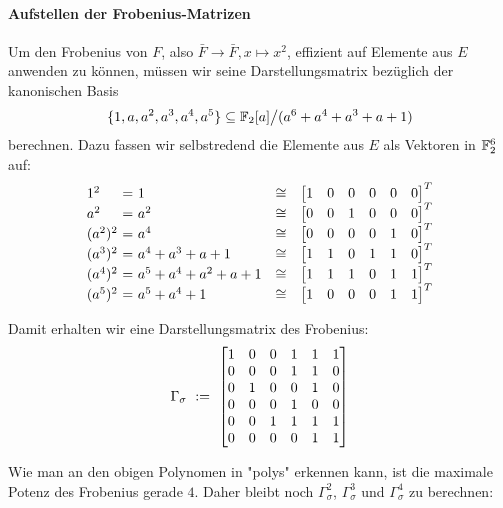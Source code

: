 \paragraph{Aufstellen der Frobenius-Matrizen}
Um den Frobenius von $F$, also 
$\bar F\to \bar F, x\mapsto x^2$,
effizient auf Elemente aus $E$ anwenden zu können,
müssen wir seine Darstellungsmatrix bezüglich der kanonischen Basis
\[\{ 1, a, a^2, a^3, a^4, a^5\} 
  \subseteq \mathbb{F}_2[a]\big/(a^6 + a^4 + a^3 + a + 1)\]
berechnen. Dazu fassen wir selbstredend die Elemente aus $E$ als Vektoren in
$\mathbb{F}_2^6$ auf:
\[\begin{array}{l@{\ =\ }l@{\quad\cong\quad}l}
  1^2 & 1 & \begin{bmatrix}1&0&0&0&0&0\end{bmatrix}^T\\
  a^2 & a^2 & \begin{bmatrix}0&0&1&0&0&0\end{bmatrix}^T\\
  (a^2)^2 & a^4 & \begin{bmatrix}0&0&0&0&1&0\end{bmatrix}^T\\
  (a^3)^2 & a^4+a^3+a+1 & \begin{bmatrix}1&1&0&1&1&0\end{bmatrix}^T\\
  (a^4)^2 & a^5 + a^4 + a^2 + a + 1 & \begin{bmatrix}1&1&1&0&1&1\end{bmatrix}^T\\
  (a^5)^2 & a^5+a^4+1 & \begin{bmatrix}1&0&0&0&1&1\end{bmatrix}^T
\end{array}\]

Damit erhalten wir eine Darstellungsmatrix des Frobenius:
\[\Gamma_\sigma \ :=\  \begin{bmatrix}
  1 & 0 & 0 & 1 & 1 & 1 \\
  0 & 0 & 0 & 1 & 1 & 0 \\
  0 & 1 & 0 & 0 & 1 & 0 \\
  0 & 0 & 0 & 1 & 0 & 0 \\
  0 & 0 & 1 & 1 & 1 & 1 \\
  0 & 0 & 0 & 0 & 1 & 1 \\
  \end{bmatrix}\]

Wie man an den obigen Polynomen in "polys" erkennen kann, ist die maximale
Potenz des Frobenius gerade $4$. Daher bleibt noch $\Gamma_\sigma^2$,
$\Gamma_\sigma^3$ und $\Gamma_\sigma^4$ zu berechnen:

